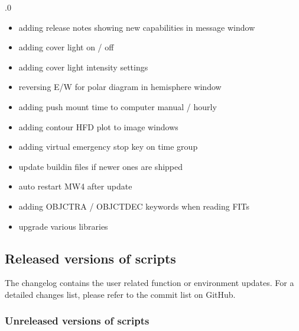 \documentclass[a4paper,10pt,english]{sphinxmanual}
\begin{document}
.0
\begin{itemize}
\item {} 
\sphinxAtStartPar
adding release notes showing new capabilities in message window

\item {} 
\sphinxAtStartPar
adding cover light on / off

\item {} 
\sphinxAtStartPar
adding cover light intensity settings

\item {} 
\sphinxAtStartPar
reversing E/W for polar diagram in hemisphere window

\item {} 
\sphinxAtStartPar
adding push mount time to computer manual / hourly

\item {} 
\sphinxAtStartPar
adding contour HFD plot to image windows

\item {} 
\sphinxAtStartPar
adding virtual emergency stop key on time group

\item {} 
\sphinxAtStartPar
update build\sphinxhyphen{}in files if newer ones are shipped

\item {} 
\sphinxAtStartPar
auto restart MW4 after update

\item {} 
\sphinxAtStartPar
adding OBJCTRA / OBJCTDEC keywords when reading FITs

\item {} 
\sphinxAtStartPar
upgrade various libraries

\end{itemize}

\sphinxstepscope


\subsection{Released versions of scripts}
\label{\detokenize{changelog/changelogScripts:released-versions-of-scripts}}\label{\detokenize{changelog/changelogScripts::doc}}
\sphinxAtStartPar
The changelog contains the user related function or environment updates. For a
detailed changes list, please refer to the commit list on GitHub.


\subsubsection{Unreleased versions of scripts}
\label{\detokenize{changelog/changelogScripts:unreleased-versions-of-scripts}}
\end{document}
